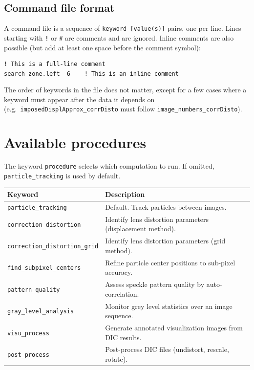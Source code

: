 \documentclass{simpledoc}
\newcommand{\scr}[1]{\texttt{\color{myblue}#1}}
\begin{document}
\subsection{Command file format}


A command file is a sequence of \texttt{keyword [value(s)]} pairs, one per line.
Lines starting with \texttt{!} or \texttt{\#} are comments and are ignored.
Inline comments are also possible (but add at least one space before the comment symbol):

\begin{verbatim}
! This is a full-line comment
search_zone.left  6    ! This is an inline comment
\end{verbatim}

\noindent The order of keywords in the file does not matter, except for a few cases where
a keyword must appear after the data it depends on (e.g.\ \scr{imposedDisplApprox\_corrDisto}
must follow \scr{image\_numbers\_corrDisto}).

\section{Available procedures}
\label{sec:procedures}

The keyword \scr{procedure} selects which computation to run.
If omitted, \scr{particle\_tracking} is used by default.

\begin{center}
\begin{tabular}{lp{5.5cm}}
\hline
\textbf{Keyword} & \textbf{Description} \\
\hline
\scr{particle\_tracking}        & Default. Track particles between images. \\
\scr{correction\_distortion}    & Identify lens distortion parameters (displacement method). \\
\scr{correction\_distortion\_grid} & Identify lens distortion parameters (grid method). \\
\scr{find\_subpixel\_centers}   & Refine particle center positions to sub-pixel accuracy. \\
\scr{pattern\_quality}          & Assess speckle pattern quality by auto-correlation. \\
\scr{gray\_level\_analysis}     & Monitor grey level statistics over an image sequence. \\
\scr{visu\_process}             & Generate annotated visualization images from DIC results. \\
\scr{post\_process}             & Post-process DIC files (undistort, rescale, rotate). \\
\hline
\end{tabular}
\end{center}
\end{document}
